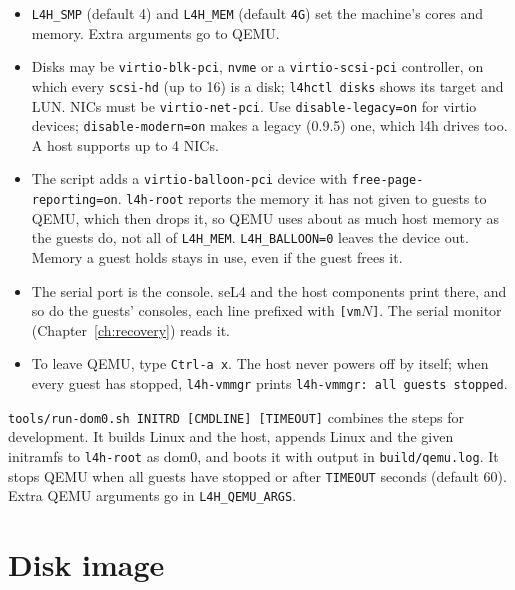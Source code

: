 \documentclass[11pt,a4paper]{report}
\newcommand{\cmd}[1]{\texttt{#1}}
\newcommand{\file}[1]{\texttt{#1}}
\begin{document}
\begin{itemize}
  \item \texttt{L4H\_SMP} (default 4) and \texttt{L4H\_MEM} (default
        \texttt{4G}) set the machine's cores and memory. Extra arguments go
        to QEMU.
  \item Disks may be \texttt{virtio-blk-pci}, \texttt{nvme} or a
        \texttt{virtio-scsi-pci} controller, on which every
        \texttt{scsi-hd} (up to 16) is a disk; \cmd{l4hctl disks} shows
        its target and LUN. NICs must
        be \texttt{virtio-net-pci}. Use \texttt{disable-legacy=on} for
        virtio devices; \texttt{disable-modern=on} makes a legacy (0.9.5)
        one, which l4h drives too. A host supports up to 4 NICs.
  \item The script adds a \texttt{virtio-balloon-pci} device with
        \texttt{free-page-reporting=on}. \texttt{l4h-root} reports the
        memory it has not given to guests to QEMU, which then drops it,
        so QEMU uses about as much host memory as the guests do, not all
        of \texttt{L4H\_MEM}. \texttt{L4H\_BALLOON=0} leaves the device
        out. Memory a guest holds stays in use, even if the guest frees it.
  \item The serial port is the console. seL4 and the host components print
        there, and so do the guests' consoles, each line prefixed with
        \texttt{[vm$N$]}. The serial monitor (Chapter~\ref{ch:recovery})
        reads it.
  \item To leave QEMU, type \texttt{Ctrl-a x}. The host never powers off by
        itself; when every guest has stopped, \texttt{l4h-vmmgr} prints
        \texttt{l4h-vmmgr: all guests stopped}.
\end{itemize}

\cmd{tools/run-dom0.sh INITRD [CMDLINE] [TIMEOUT]} combines the steps for
development. It builds Linux and the host, appends Linux and the given
initramfs to \texttt{l4h-root} as dom0, and boots it with output in \file{build/qemu.log}. It stops QEMU when
all guests have stopped or after \texttt{TIMEOUT} seconds (default 60).
Extra QEMU arguments go in \texttt{L4H\_QEMU\_ARGS}.

\section{Disk image}
\label{sec:image}
\end{document}
